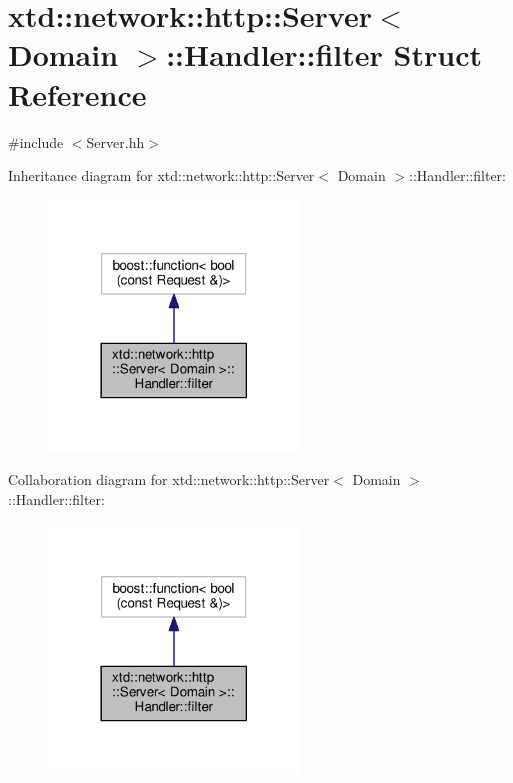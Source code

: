\hypertarget{structxtd_1_1network_1_1http_1_1Server_1_1Handler_1_1filter}{}\section{xtd\+:\+:network\+:\+:http\+:\+:Server$<$ Domain $>$\+:\+:Handler\+:\+:filter Struct Reference}
\label{structxtd_1_1network_1_1http_1_1Server_1_1Handler_1_1filter}


{\ttfamily \#include $<$Server.\+hh$>$}



Inheritance diagram for xtd\+:\+:network\+:\+:http\+:\+:Server$<$ Domain $>$\+:\+:Handler\+:\+:filter\+:
\nopagebreak
\begin{figure}[H]
\begin{center}
\leavevmode
\includegraphics[width=189pt]{structxtd_1_1network_1_1http_1_1Server_1_1Handler_1_1filter__inherit__graph}
\end{center}
\end{figure}


Collaboration diagram for xtd\+:\+:network\+:\+:http\+:\+:Server$<$ Domain $>$\+:\+:Handler\+:\+:filter\+:
\nopagebreak
\begin{figure}[H]
\begin{center}
\leavevmode
\includegraphics[width=189pt]{structxtd_1_1network_1_1http_1_1Server_1_1Handler_1_1filter__coll__graph}
\end{center}
\end{figure}
